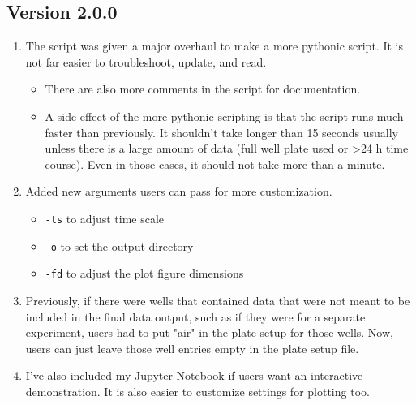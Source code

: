 \documentclass[12pt]{article}
\begin{document}
\subsection*{Version 2.0.0}
\label{sec:org7cb02ed}
\begin{enumerate}
\item The script was given a major overhaul to make a more pythonic script. It is not far easier to troubleshoot, update, and read.
\begin{itemize}
\item There are also more comments in the script for documentation.
\item A side effect of the more pythonic scripting is that the script runs much faster than previously. It shouldn't take longer than 15 seconds usually unless there is a large amount of data (full well plate used or >24 h time course). Even in those cases, it should not take more than a minute.
\end{itemize}
\item Added new arguments users can pass for more customization.
\begin{itemize}
\item \texttt{-ts} to adjust time scale
\item \texttt{-o} to set the output directory
\item \texttt{-fd} to adjust the plot figure dimensions
\end{itemize}
\item Previously, if there were wells that contained data that were not meant to be included in the final data output, such as if they were for a separate experiment, users had to put "air" in the plate setup for those wells. Now, users can just leave those well entries empty in the plate setup file.
\item I've also included my Jupyter Notebook if users want an interactive demonstration. It is also easier to customize settings for plotting too.
\end{enumerate}
\end{document}
